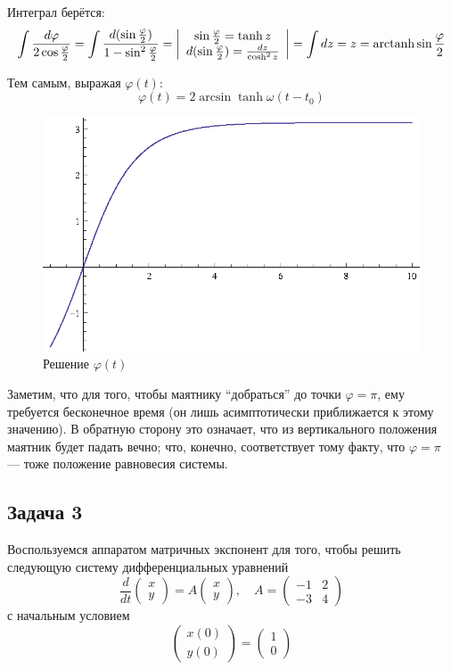 \documentclass[a4paper,12pt]{article}
\begin{document}
\noindent
Интеграл берётся:
\[
\int\frac{d\varphi}{2\cos\frac{\varphi}{2}}=\int\frac{d(\sin\frac{\varphi}{2})}{1-\sin^{2}\frac{\varphi}{2}}=\left|\begin{array}{c}
\sin\frac{\varphi}{2}=\tanh z\\
d(\sin\frac{\varphi}{2})=\frac{dz}{\cosh^{2}z}
\end{array}\right|=\int dz=z={\rm arctanh}\sin\frac{\varphi}{2}
\]

\noindent
Тем самым, выражая $\varphi(t)$:
\[
\varphi(t)=2\arcsin\tanh\omega(t-t_{0})
\]


\begin{figure}[h]
\caption{Решение $\varphi(t)$}
\centering
\includegraphics[width=0.5\columnwidth]{pendulum.eps}
\end{figure}
\noindent
Заметим, что для того, чтобы маятнику ``добраться'' до точки $\varphi=\pi$,
ему требуется бесконечное время (он лишь асимптотически приближается
к этому значению). В обратную сторону это означает, что из вертикального
положения маятник будет падать вечно; что, конечно, соответствует тому факту,
что $\varphi=\pi$ --- тоже положение равновесия системы.

\subsection*{Задача 3}

Воспользуемся аппаратом матричных экспонент для того, чтобы решить следующую систему дифференциальных уравнений
\[
\frac{d}{dt}
\begin{pmatrix}
x\\
y
\end{pmatrix}
=
A
\begin{pmatrix}
x\\
y
\end{pmatrix}
,\quad A=\begin{pmatrix}
-1 & 2\\
-3 & 4
\end{pmatrix}
\]
с начальным условием
\[
\begin{pmatrix}
x(0)\\
y(0)
\end{pmatrix}=
\begin{pmatrix}
1\\
0
\end{pmatrix}
\] 
\noindent
\end{document}

